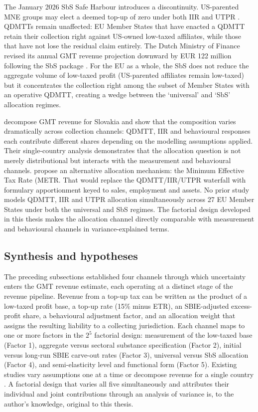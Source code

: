 \documentclass[11pt,a4paper]{article}
\begin{document}
The January 2026 SbS Safe Harbour introduces a discontinuity. US-parented MNE groups may elect a deemed top-up of zero under both IIR and UTPR \citep{oecd2026}. QDMTTs remain unaffected: EU Member States that have enacted a QDMTT retain their collection right against US-owned low-taxed affiliates, while those that have not lose the residual claim entirely. The Dutch Ministry of Finance revised its annual GMT revenue projection downward by EUR 122 million following the SbS package \citep{1028}. For the EU as a whole, the SbS does not reduce the aggregate volume of low-taxed profit (US-parented affiliates remain low-taxed) but it concentrates the collection right among the subset of Member States with an operative QDMTT, creating a wedge between the `universal' and `SbS' allocation regimes.

\citet{boukal2026} decompose GMT revenue for Slovakia and show that the composition varies dramatically across collection channels: QDMTT, IIR and behavioural responses each contribute different shares depending on the modelling assumptions applied. Their single-country analysis demonstrates that the allocation question is not merely distributional but interacts with the measurement and behavioural channels. \citet{cobham2022} propose an alternative allocation mechanism: the Minimum Effective Tax Rate (METR. That would replace the QDMTT/IIR/UTPR waterfall with formulary apportionment keyed to sales, employment and assets. No prior study models QDMTT, IIR and UTPR allocation simultaneously across 27 EU Member States under both the universal and SbS regimes. The factorial design developed in this thesis makes the allocation channel directly comparable with measurement and behavioural channels in variance-explained terms.

\subsection{Synthesis and hypotheses}\label{sec:theoretical_framework}\label{sec:hypotheses}

The preceding subsections established four channels through which uncertainty enters the GMT revenue estimate, each operating at a distinct stage of the revenue pipeline. Revenue from a top-up tax can be written as the product of a low-taxed profit base, a top-up rate (15\% minus ETR), an SBIE-adjusted excess-profit share, a behavioural adjustment factor, and an allocation weight that assigns the resulting liability to a collecting jurisdiction. Each channel maps to one or more factors in the $2^5$ factorial design: measurement of the low-taxed base (Factor 1), aggregate versus sectoral substance specification (Factor 2), initial versus long-run SBIE carve-out rates (Factor 3), universal versus SbS allocation (Factor 4), and semi-elasticity level and functional form (Factor 5). Existing studies vary assumptions one at a time \citep{barake2022,hugger2026} or decompose revenue for a single country \citep{boukal2026}. A factorial design that varies all five simultaneously and attributes their individual and joint contributions through an analysis of variance is, to the author's knowledge, original to this thesis.
\end{document}
